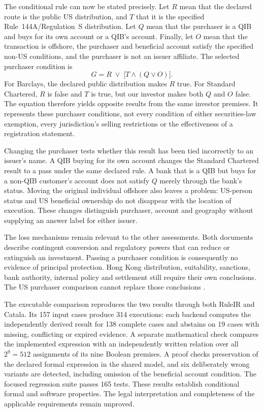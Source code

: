 The conditional rule can now be stated precisely. Let $R$ mean that the
declared route is the public US distribution, and $T$ that it is the specified
Rule~144A/Regulation~S distribution. Let $Q$ mean that the purchaser is a QIB
and buys for its own account or a QIB's account. Finally, let $O$ mean that the
transaction is offshore, the purchaser and beneficial account satisfy the
specified non-US conditions, and the purchaser is not an issuer affiliate.
The selected purchaser condition is
\[
   G = R \;\lor\; \bigl[T\land(Q\lor O)\bigr].
\]
For Barclays, the declared public distribution makes $R$ true. For Standard
Chartered, $R$ is false and $T$ is true, but our investor makes both $Q$ and $O$
false. The equation therefore yields opposite results from the same investor
premises. It represents these purchaser conditions, not every condition of
either securities-law exemption, every jurisdiction's selling restrictions or
the effectiveness of a registration statement.

Changing the purchaser tests whether this result has been tied incorrectly to
an issuer's name. A QIB buying for its own account changes the Standard
Chartered result to a pass under the same declared rule. A bank that is a QIB
but buys for a non-QIB customer's account does not satisfy $Q$ merely through
the bank's status. Moving the original individual offshore also leaves a
problem: US-person status and US beneficial ownership do not disappear with
the location of execution. These changes distinguish purchaser, account and
geography without supplying an answer label for either issuer.

The loss mechanisms remain relevant to the other assessments. Both documents
describe contingent conversion and regulatory powers that can reduce or
extinguish an investment. Passing a purchaser condition is consequently no
evidence of principal protection. Hong Kong distribution, suitability,
sanctions, bank authority, internal policy and settlement still require their
own conclusions. The US purchaser comparison cannot replace those conclusions
\citep[Barclays cover and pp.~S-16, S-102; Standard Chartered pp.~i, 140--142]{barclayscoco2025,standardcharteredcoco2025}.

The executable comparison reproduces the two results through both RuleIR and
Catala. Its 157 input cases produce 314 executions: each backend computes the
independently derived result for 138 complete cases and abstains on 19 cases
with missing, conflicting or expired evidence. A separate mathematical check
compares the implemented expression with an independently written relation
over all $2^9=512$ assignments of its nine Boolean premises. A proof checks
preservation of the declared formal expression in the shared model, and six
deliberately wrong variants are detected, including omission of the beneficial
account condition. The focused regression suite passes 165 tests. These results
establish conditional formal and software properties. The legal interpretation
and completeness of the applicable requirements remain unproved.

